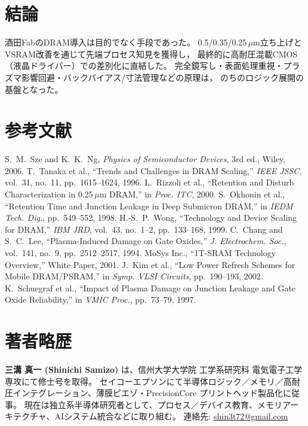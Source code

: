 \documentclass[conference]{IEEEtran}
\begin{document}
\section{結論}
酒田FabのDRAM導入は目的でなく手段であった。
0.5/0.35/0.25\,$\mu$m立ち上げとVSRAM改善を通じて先端プロセス知見を獲得し，
最終的に高耐圧混載CMOS（液晶ドライバー）での差別化に直結した。
完全鏡写し・表面処理重視・プラズマ影響回避・バックバイアス/寸法管理などの原理は，
のちのロジック展開の基盤となった。

\section*{参考文献}
\begin{thebibliography}{00}
S.~M.~Sze and K.~K.~Ng, \emph{Physics of Semiconductor Devices}, 3rd ed., Wiley, 2006.
T.~Tanaka et al., ``Trends and Challenges in DRAM Scaling,'' \emph{IEEE JSSC}, vol.~31, no.~11, pp.~1615--1624, 1996.
L.~Rizzoli et al., ``Retention and Disturb Characterization in 0.25\,\(\mu\)m DRAM,'' in \emph{Proc. ITC}, 2000.
S.~Okhonin et al., ``Retention Time and Junction Leakage in Deep Submicron DRAM,'' in \emph{IEDM Tech. Dig.}, pp.~549--552, 1998.
H.-S.~P.~Wong, ``Technology and Device Scaling for DRAM,'' \emph{IBM JRD}, vol.~43, no.~1–2, pp.~133--168, 1999.
C.~Chang and S.~C.~Lee, ``Plasma-Induced Damage on Gate Oxides,'' \emph{J. Electrochem. Soc.}, vol.~141, no.~9, pp.~2512--2517, 1994.
MoSys Inc., ``1T-SRAM Technology Overview,'' White Paper, 2001.
J.~Kim et al., ``Low Power Refresh Schemes for Mobile DRAM/PSRAM,'' in \emph{Symp. VLSI Circuits}, pp.~190--193, 2002.
K.~Schuegraf et al., ``Impact of Plasma Damage on Junction Leakage and Gate Oxide Reliability,'' in \emph{VMIC Proc.}, pp.~73--79, 1997.
\end{thebibliography}

\section*{著者略歴}
\noindent\textbf{三溝 真一 (Shinichi Samizo)} は、信州大学大学院 工学系研究科 電気電子工学専攻にて修士号を取得。
セイコーエプソンにて半導体ロジック／メモリ／高耐圧インテグレーション、薄膜ピエゾ・PrecisionCore プリントヘッド製品化に従事。
現在は独立系半導体研究者として、プロセス／デバイス教育、メモリアーキテクチャ、AIシステム統合などに取り組む。
連絡先: \href{mailto:shin3t72@gmail.com}{shin3t72@gmail.com}
\end{document}
